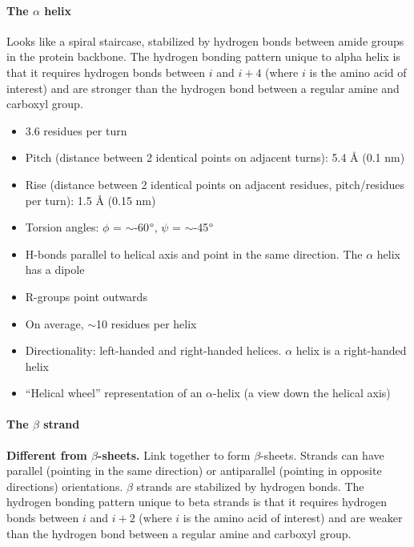 \documentclass[letterpaper, 12pt]{article}
\begin{document}
\paragraph{The $\alpha$ helix} Looks like a spiral staircase, stabilized by hydrogen bonds between amide groups in the protein backbone. The hydrogen bonding pattern unique to alpha helix is that it requires hydrogen bonds between $i$ and $i+4$ (where $i$ is the amino acid of interest) and are stronger than the hydrogen bond between a regular amine and carboxyl group.

\begin{itemize}
\item 3.6 residues per turn
\item Pitch (distance between 2 identical points on adjacent turns): 5.4 Å (0.1 nm)
\item Rise (distance between 2 identical points on adjacent residues, pitch/residues per turn): 1.5 Å (0.15 nm)
\item Torsion angles: $\phi$ = $\sim$-60$\degree$, $\psi$ = $\sim$-45$\degree$
\item H-bonds parallel to helical axis and point in the same direction. The $\alpha$ helix has a dipole
\item R-groups point outwards
\item On average, $\sim$10 residues per helix
\item Directionality: left-handed and right-handed helices. $\alpha$ helix is a right-handed helix
\item ``Helical wheel'' representation of an $\alpha$-helix (a view down the helical axis)
\end{itemize}

\paragraph{The $\beta$ strand} \textbf{Different from $\beta$-sheets.} Link together to form $\beta$-sheets. Strands can have parallel (pointing in the same direction) or antiparallel (pointing in opposite directions) orientations. $\beta$ strands are stabilized by hydrogen bonds. The hydrogen bonding pattern unique to beta strands is that it requires hydrogen bonds between $i$ and $i+2$ (where $i$ is the amino acid of interest) and are weaker than the hydrogen bond between a regular amine and carboxyl group.
\end{document}
